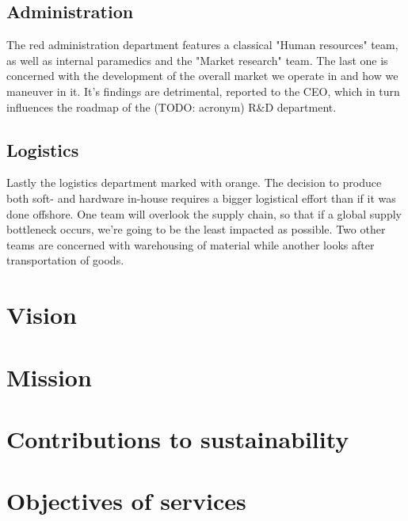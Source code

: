 \subsection{Administration}
The red administration department features a classical "Human resources" team, as well as internal paramedics and the "Market research" team. The last one is concerned with the development of the overall market we operate in and how we maneuver in it. It's findings are detrimental, reported to the CEO, which in turn influences the roadmap of the (TODO: acronym) R\&D department.
\subsection{Logistics}\label{org-logistics}
Lastly the logistics department marked with orange. The decision to produce both soft- and hardware in-house requires a bigger logistical effort than if it was done offshore. One team will overlook the supply chain, so that if a global supply bottleneck occurs, we're going to be the least impacted as possible. Two other teams are concerned with warehousing of material while another looks after transportation of goods.
\section{Vision}
\section{Mission}
\section{Contributions to sustainability}
\section{Objectives of services}

